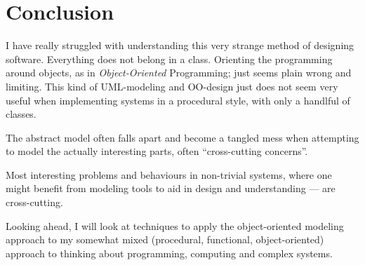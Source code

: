 %
%
%


\section{Conclusion}
%
%
I have really struggled with understanding this very strange method of
designing software. Everything does not belong in a class. Orienting the
programming around objects, as in \emph{Object-Oriented} Programming; just
seems plain wrong and limiting.  This kind of UML-modeling and OO-design just
does not seem very useful when implementing systems in a procedural style, with
only a handlful of classes.

The abstract model often falls apart and become a tangled mess when attempting
to model the actually interesting parts, often ``cross-cutting concerns''. 

Most interesting problems and behaviours in non-trivial systems, where one
might benefit from modeling tools to aid in design and understanding --- are
cross-cutting.

Looking ahead, I will look at techniques to apply the object-oriented modeling
approach to my somewhat mixed (procedural, functional, object-oriented)
approach to thinking about programming, computing and complex systems.
